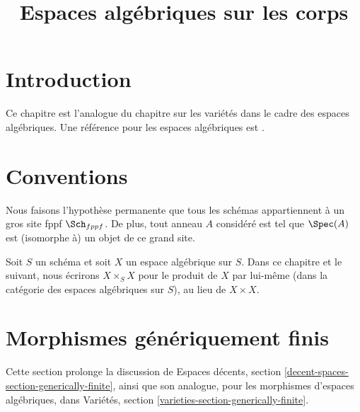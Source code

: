 

%


\title{Espaces algébriques sur les corps}


\maketitle

\label{section-phantom}

\tableofcontents

\section{Introduction}
\label{section-introduction}

\noindent
Ce chapitre est l'analogue du chapitre sur les variétés dans le cadre
des espaces algébriques. Une référence pour les espaces algébriques est
\cite{Kn}.


\section{Conventions}
\label{section-conventions}

\noindent
Nous faisons l'hypothèse permanente que tous les schémas appartiennent à
un gros site fppf $\Sch_{fppf}$. De plus, tout anneau $A$ considéré
est tel que $\Spec(A)$ est (isomorphe à) un
objet de ce grand site.

\medskip\noindent
Soit $S$ un schéma et soit $X$ un espace algébrique sur $S$.
Dans ce chapitre et le suivant, nous écrirons $X \times_S X$
pour le produit de $X$ par lui-même (dans la catégorie des espaces algébriques
sur $S$), au lieu de $X \times X$.



\section{Morphismes génériquement finis}
\label{section-generically-finite}

\noindent
Cette section prolonge la discussion de
Espaces décents, section \ref{decent-spaces-section-generically-finite},
ainsi que son analogue, pour les morphismes d'espaces algébriques, dans
Variétés, section \ref{varieties-section-generically-finite}.

